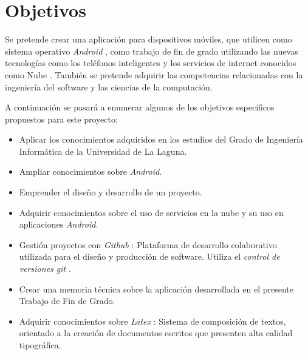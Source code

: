 %
%
%
%

\cleardoublepage
\chapter{Objetivos}
\label{chap:objetives}

	Se pretende crear una aplicación para dispositivos móviles, que utilicen como sistema operativo {\it Android} \cite{2:android:online}, como trabajo de fin de grado utilizando las nuevas tecnologías como los teléfonos inteligentes y los servicios de internet conocidos como Nube \cite{57:nube:online}. También se pretende adquirir las competencias relacionadas con la ingeniería del software y las ciencias de la computación. 
	
	A continuación se pasará a enumerar algunos de los objetivos específicos propuestos para este proyecto:
	
	\begin{itemize}
		\item Aplicar los conocimientos adquiridos en los estudios del Grado de Ingeniería Informática de la Universidad de La Laguna.
		\item Ampliar conocimientos sobre {\it Android}.
		\item Emprender el diseño y desarrollo de un proyecto.
		\item Adquirir conocimientos sobre el uso de servicios en la nube y su uso en aplicaciones {\it Android}.
		\item Gestión proyectos con {\it Github} \cite{9:github:online}: Plataforma de desarrollo colaborativo utilizada para el diseño y producción de software. Utiliza el {\it control de versiones git} \cite{5:git:online}.
		\item Crear una memoria técnica sobre la aplicación desarrollada en el presente Trabajo de Fin de Grado.
		\item Adquirir conocimientos sobre {\it Latex} \cite{8:latex:online}: Sistema de composición de textos, orientado a la creación de documentos escritos que presenten alta calidad tipográfica.
	\end{itemize}